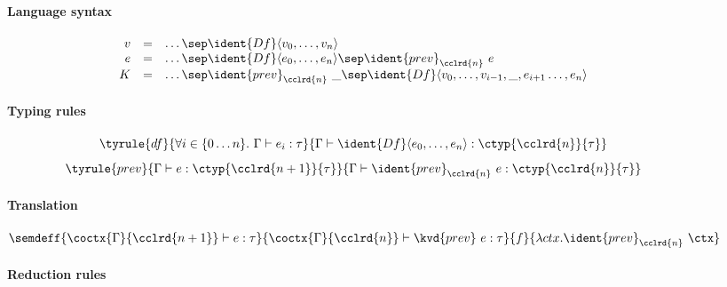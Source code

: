 \begin{figure}[t]
\paragraph{Language syntax}

\begin{equation*}
\begin{array}{rcl}
v &=& \ldots \sep \ident{Df}\langle v_0, \ldots, v_n\rangle \\
e &=& \ldots \sep \ident{Df}\langle e_0, \ldots, e_n\rangle \sep \ident{prev}_{\cclrd{n}}~e\\
K &=& \ldots \sep \ident{prev}_{\cclrd{n}}~\_ \sep \ident{Df}\langle v_0, \ldots, v_{i-1}, \_, e_{i+1} \ldots, e_n\rangle
\end{array}
\end{equation*}

\vspace{1.25em}
\paragraph{Typing rules}

\begin{equation*}
\tyrule{df}
  { \forall i\in\{ 0 \ldots n \}. ~ \Gamma \vdash e_i : \tau}
  { \Gamma \vdash \ident{Df}\langle e_0, \ldots, e_n \rangle : \ctyp{\cclrd{n}}{\tau} }
\end{equation*}
\begin{equation*}
\tyrule{prev}
  { \Gamma \vdash e : \ctyp{\cclrd{n+1}}{\tau} }
  { \Gamma \vdash \ident{prev}_{\cclrd{n}}~e : \ctyp{\cclrd{n}}{\tau} }
\end{equation*}

\vspace{1.25em}
\paragraph{Translation}

\begin{equation*}
\semdeff
  { \coctx{\Gamma}{\cclrd{n+1}} \vdash e : \tau }
  { \coctx{\Gamma}{\cclrd{n}} \vdash \kvd{prev}~e : \tau }
  {f}
  {\lambda ctx.\ident{prev}_{\cclrd{n}}~\ctx }
\end{equation*}

\vspace{1.25em}
\paragraph{Reduction rules}


\end{figure}
